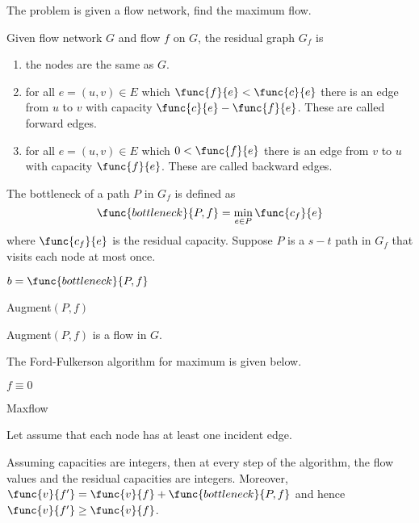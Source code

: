 The problem is given a flow network, find the maximum flow. 
\begin{definition}
    Given flow network \(G\) and flow \(f\) on \(G\), the residual graph \(G_f\) is 
    \begin{enumerate}
        \item the nodes are the same as \(G\).
        \item for all \(e =(u,v) \in E\) which \(\func{f}{e} < \func{c}{e}\) there is an edge from \(u\) to \(v\) with capacity \(\func{c}{e}  - \func{f}{e}\). These are called forward edges.
        \item for all \(e =(u,v) \in E\) which \(0 < \func{f}{e}\) there is an edge from \(v\) to \(u\) with capacity \(\func{f}{e}\). These are called backward edges.
    \end{enumerate}
\end{definition}
The bottleneck of a path \(P\) in \(G_f\) is defined as 
\begin{equation*}
    \func{bottleneck}{P,f} = \min_{e \in P} \func{c_f}{e}
\end{equation*}
where \(\func{c_f}{e}\) is the residual capacity.
Suppose \(P\) is a \(s-t\) path in \(G_f\) that visits each node at most once.
\begin{algorithm}
    \DontPrintSemicolon
    \(b = \func{bottleneck}{P,f}\)\; 
    \caption{Augment\((P,f)\)}
\end{algorithm}

\begin{theorem}
    Augment\((P,f)\) is a flow in \(G\). 
\end{theorem}
The Ford-Fulkerson algorithm for maximum is given below.
\begin{algorithm}
    \(f \equiv 0\)\; 
    \caption{Maxflow}
\end{algorithm}
Let assume that each node has at least one incident edge.
\begin{proposition}
    Assuming capacities are integers, then at every step of the algorithm, the flow values and the residual capacities are integers. Moreover, \(\func{v}{f'} = \func{v}{f} + \func{bottleneck}{P,f}\) and hence \(\func{v}{f'} \geq \func{v}{f}\).
\end{proposition}


